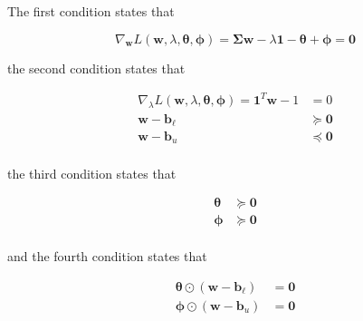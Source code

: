 \documentclass{beamer}
\begin{document}
\begin{frame}

\justifying
The first condition states that

\justifying
\begin{equation*}
	\nabla_{\mathbf{w}} L\left(\mathbf{w},\lambda,\boldsymbol\theta,\boldsymbol\phi\right) = \mathbf{\Sigma}\mathbf{w} - \lambda \mathbf{1} - \boldsymbol\theta + \boldsymbol\phi = \mathbf{0}
\end{equation*}

\vspace{0.2cm}
\justifying
the second condition states that

\justifying
\begin{equation*}
\begin{aligned}
	\nabla_{\lambda} L\left(\mathbf{w},\lambda,\boldsymbol\theta,\boldsymbol\phi\right) = \mathbf{1}^{T}\mathbf{w} - 1 & = 0\\
	\mathbf{w} - \mathbf{b}_{\ell} & \succcurlyeq \mathbf{0}\\
	\mathbf{w} - \mathbf{b}_{u} & \preccurlyeq \mathbf{0}\\
\end{aligned}
\end{equation*}

\justifying
the third condition states that

\justifying
\begin{equation*}
\begin{aligned}
	\boldsymbol\theta & \succcurlyeq \mathbf{0} \\
	\boldsymbol\phi & \succcurlyeq \mathbf{0}\\
\end{aligned}
\end{equation*}

\vspace{0.2cm}
\justifying
and the fourth condition states that

\justifying
\begin{equation*}
\begin{aligned}
	\boldsymbol\theta \odot \left( \mathbf{w}-\mathbf{b}_{\ell} \right) & = \mathbf{0} \\
	\boldsymbol\phi \odot \left( \mathbf{w}-\mathbf{b}_{u} \right) & = \mathbf{0} \\
\end{aligned}
\end{equation*}

\end{frame}
\end{document}
